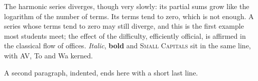 \documentclass{article}
\begin{document}
The harmonic series diverges, though very slowly: its partial sums grow like
the logarithm of the number of terms. Its terms tend to zero, which is not
enough. A series whose terms tend to zero may still diverge, and this is the
first example most students meet; the effect of the difficulty, efficiently
official, is affirmed in the classical flow of offices. \emph{Italic}, \textbf{bold}
and \textsc{Small Capitals} sit in the same line, with AV, To and Wa kerned.

A second paragraph, indented, ends here with a short last line.
\end{document}
